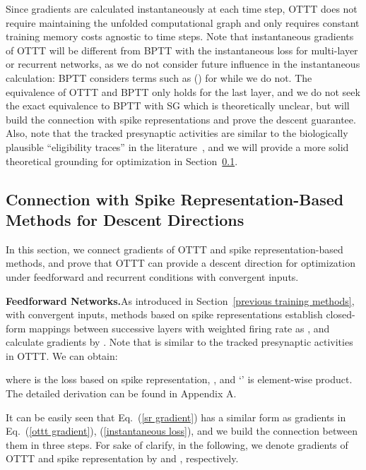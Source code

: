 \documentclass{article}
\begin{document}
Since gradients are calculated instantaneously at each time step, OTTT does not require maintaining the unfolded computational graph and only requires constant training memory costs agnostic to time steps. Note that instantaneous gradients of OTTT will be different from BPTT with the instantaneous loss for multi-layer or recurrent networks, as we do not consider future influence in the instantaneous calculation: BPTT considers terms such as  () for  while we do not. The equivalence of OTTT and BPTT only holds for the last layer, and we do not seek the exact equivalence to BPTT with SG which is theoretically unclear, but will build the connection with spike representations and prove the descent guarantee. Also, note that the tracked presynaptic activities are similar to the biologically plausible ``eligibility traces'' in the literature~\cite{zenke2018superspike, bellec2020solution,murray2019local}, and we will provide a more solid theoretical grounding for optimization in Section~\ref{connection spike representation}.

\subsection{Connection with Spike Representation-Based Methods for Descent Directions}\label{connection spike representation}
\vspace{-2mm}

In this section, we connect gradients of OTTT and spike representation-based methods, and prove that OTTT can provide a descent direction for optimization under feedforward and recurrent conditions with convergent inputs. 

\textbf{Feedforward Networks.}\quad As introduced in Section~\ref{previous training methods}, with convergent inputs, methods based on spike representations establish closed-form mappings between successive layers with weighted firing rate  as , and calculate gradients by . Note that  is similar to the tracked presynaptic activities  in OTTT. We can obtain: 

where  is the loss based on spike representation, , and `' is element-wise product. The detailed derivation can be found in Appendix A. 

It can be easily seen that Eq.~(\ref{sr gradient}) has a similar form as gradients in Eq.~(\ref{ottt gradient}), (\ref{instantaneous loss}), and we build the connection between them in three steps. For sake of clarify, in the following, we denote gradients of OTTT and spike representation by  and , respectively. 
\end{document}
